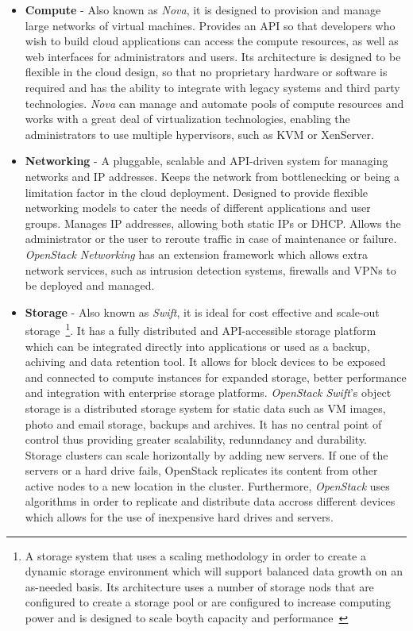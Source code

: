 \begin{itemize}
\item \textbf{Compute} - Also known as \textit{Nova}, it is designed to provision and manage large networks of virtual machines. Provides an API so that developers who wish to build cloud applications can access the compute resources, as well as web interfaces for administrators and users. Its architecture is designed to be flexible in the cloud design, so that no proprietary hardware or software is required and has the ability to integrate with legacy systems and third party technologies. \textit{Nova} can manage and automate pools of compute resources and works with a great deal of virtualization technologies, enabling the administrators to use multiple hypervisors, such as KVM or XenServer.
\item \textbf{Networking} - A pluggable, scalable and API-driven system for managing networks and IP addresses. Keeps the network from bottlenecking or being a limitation factor in the cloud deployment. Designed to provide flexible networking models to cater the needs of different applications and user groups. Manages IP addresses, allowing both static IPs or DHCP. Allows the administrator or the user to reroute traffic in case of maintenance or failure. \textit{OpenStack Networking} has an extension framework which allows extra network services, such as intrusion detection systems, firewalls and VPNs to be deployed and managed.
\item \textbf{Storage} - Also known as \textit{Swift}, it is ideal for cost effective and scale-out storage~\footnote{A storage system that uses a scaling methodology in order to create a dynamic storage environment which will support balanced data growth on an as-needed basis. Its architecture uses a number of storage nods that are configured to create a storage pool or are configured to increase computing power and is designed to scale boyth capacity and performance~\cite{http://www.webopedia.com/TERM/S/scale_out_storage.html}}. It has a fully distributed and API-accessible storage platform which can be integrated directly into applications or used as a backup, achiving and data retention tool. It allows for block devices to be exposed and connected to compute instances for expanded storage, better performance and integration with enterprise storage platforms. \textit{OpenStack Swift}'s object storage is a distributed storage system for static data such as VM images, photo and email storage, backups and archives. It has no central point of control thus providing greater scalability, redunndancy and durability. Storage clusters can scale horizontally by adding new servers. If one of the servers or a hard drive fails, OpenStack replicates its content from other active nodes to a new location in the cluster. Furthermore, \textit{OpenStack} uses algorithms in order to replicate and distribute data accross different devices which allows for the use of inexpensive hard drives and servers.

\end{itemize}
